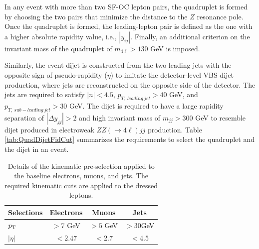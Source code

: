In any event with more than two SF-OC lepton pairs, the quadruplet is formed by choosing the two pairs that minimize the distance to the $Z$ resonance pole. Once the quadruplet is formed, the leading-lepton pair is defined as the one with a higher absolute rapidity value, i.e., $|y_{ij}|$. Finally, an additional criterion on the invariant mass of the quadruplet of $m_{4\ell} > 130$ GeV is imposed. 

Similarly, the event dijet is constructed from the two leading jets with the opposite sign of pseudo-rapidity ($\eta$) to imitate the detector-level VBS dijet production, where jets are reconstructed on the opposite side of the detector. The jets are required to satisfy $|n| < 4.5$, $p_{T,~leading~jet} > 40$ GeV, and $p_{T,~sub-leading~jet} > 30$ GeV. The dijet is required to have a large rapidity separation of $|\Delta y_{jj}| > 2$ and high invariant mass of $m_{jj} > 300$ GeV to resemble dijet produced in electroweak $ZZ (\rightarrow 4 \ell) jj$ production. Table \ref{tab:QuadDijetFidCut} summarizes the requirements to select the quadruplet and the dijet in an event.

\begin{table}[ht]
    \centering
    \caption{Details of the kinematic pre-selection applied to the baseline electrons, muons, and jets. The required kinematic cuts are applied to the dressed leptons.
    \label{tab:FidObjectCut}}
    \begin{tabular}{|| l || c | c | c ||}
        \hline
        Selections      & Electrons             &       Muons        &          Jets            \\
        \hline\hline
        $p_{\textrm{T} ~}$          & $> 7$ GeV             &       $ >5$ GeV    &      $>30$GeV        \\
        \hline 
        $|\eta|$            &  $< 2.47  $           &       $ < 2.7 $        &      $ < 4.5$            \\
        \hline
    \end{tabular}
\end{table}             
    
